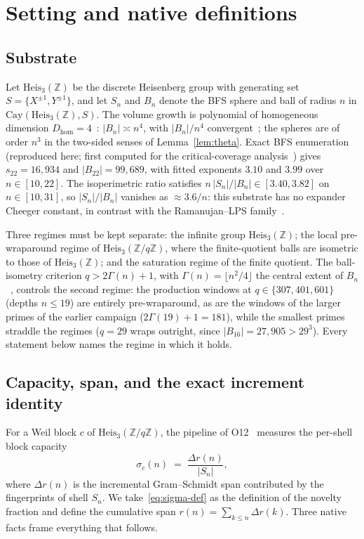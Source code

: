 \documentclass[11pt,a4paper]{article}
\theoremstyle{definition}
\newcommand{\Heis}{\mathrm{Heis}_3(\mathbb{Z})}
\newcommand{\Heisq}{\mathrm{Heis}_3(\mathbb{Z}/q\mathbb{Z})}
\newcommand{\Dhom}{D_{\mathrm{hom}}}
\begin{document}
\section{Setting and native definitions}
\label{sec:setting}

\subsection{Substrate}
\label{ssec:substrate}

Let $\Heis$ be the discrete Heisenberg group with generating set $S = \{X^{\pm 1}, Y^{\pm 1}\}$, and let
$S_n$ and $B_n$ denote the BFS sphere and ball of radius $n$ in $\mathrm{Cay}(\Heis, S)$.
The volume growth is polynomial of homogeneous dimension $\Dhom = 4$~\cite{Bass1972,Guivarch1973}:
$|B_n| \asymp n^4$, with $|B_n|/n^4$ convergent~\cite{Pansu1983}; the spheres are of order $n^3$ in the
two-sided senses of Lemma~\ref{lem:theta}.
Exact BFS enumeration (reproduced here; first computed for the critical-coverage
analysis~\cite{Beau2026ccnote}) gives $s_{22} = 16{,}934$ and $|B_{22}| = 99{,}689$, with fitted exponents
$3.10$ and $3.99$ over $n \in [10, 22]$.
The isoperimetric ratio satisfies $n\,|S_n|/|B_n| \in [3.40, 3.82]$ on $n \in [10, 31]$, so
$|S_n|/|B_n|$ vanishes as $\approx 3.6/n$: this substrate has no expander Cheeger constant, in contrast
with the Ramanujan--LPS family~\cite{LPS88}.

Three regimes must be kept separate: the infinite group $\Heis$; the local pre-wraparound regime of
$\Heisq$, where the finite-quotient balls are isometric to those of $\Heis$; and the saturation regime of
the finite quotient.
The ball-isometry criterion $q > 2\Gamma(n) + 1$, with $\Gamma(n) = \lfloor n^2/4 \rfloor$ the central
extent of $B_n$~\cite{Beau2026ccnote}, controls the second regime: the production windows at
$q \in \{307, 401, 601\}$ (depths $n \le 19$) are entirely pre-wraparound, as are the windows of the larger
primes of the earlier campaign ($2\Gamma(19) + 1 = 181$), while the smallest primes straddle the regimes
($q = 29$ wraps outright, since $|B_{16}| = 27{,}905 > 29^3$).
Every statement below names the regime in which it holds.

\subsection{Capacity, span, and the exact increment identity}
\label{ssec:definitions}

For a Weil block $c$ of $\Heisq$, the pipeline of O12~\cite{Beau2026a16} measures the per-shell block
capacity
\begin{equation}
  \label{eq:sigma-def}
  \sigma_c(n) \;=\; \frac{\Delta r(n)}{|S_n|},
\end{equation}
where $\Delta r(n)$ is the incremental Gram--Schmidt span contributed by the fingerprints of shell $S_n$.
We take~\eqref{eq:sigma-def} as the definition of the novelty fraction and define the cumulative span
$r(n) = \sum_{k \le n} \Delta r(k)$.
Three native facts frame everything that follows.
\end{document}
